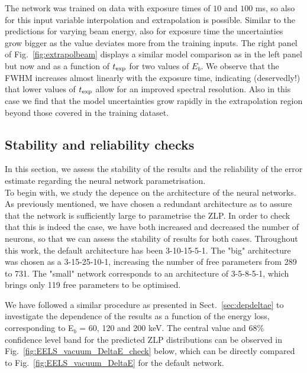 The network was trained on data with exposure times of $10$ and $100$ ms,
so also for this input variable interpolation and extrapolation is possible. 
%
Similar to the predictions for varying beam energy, also for exposure time the uncertainties 
grow bigger as the value deviates more from the training inputs.
%
The right panel of Fig.~\ref{fig:extrapolbeam} displays a similar model
comparison as in the left panel but now and as a function of $t_{\rm exp}$ for two values of $E_b$.
%
We observe that the FWHM increases almost linearly with the exposure time, indicating (deservedly!)
that lower values of $t_{\rm exp}$ allow for an improved spectral resolution.
%
Also in this case we find that the model uncertainties grow rapidly in the
extrapolation region beyond those covered in the training dataset.


\subsection{Stability and reliability checks}
In this section, we assess the stability of the results and the reliability of the 
error estimate regarding the neural network parametrisation.\\

To begin with, we study the depence on the architecture of the neural networks. 
As previously mentioned, we have chosen a redundant architecture as to assure that the network
is sufficiently large to parametrise the ZLP.
%
In order to check that this is indeed the case, we have both increased and decreased the
number of neurons, so that we can assess the stability of results for both cases.
%
Throughout this work, the default architecture has been 3-10-15-5-1. 
The "big" architecture was chosen as a 3-15-25-10-1, increasing the number of free
parameters from 289 to 731. 
%
The "small" network corresponds to an architecture of 3-5-8-5-1, which brings only 119
free parameters to be optimised. 

We have followed a similar procedure as presented in Sect.~\ref{sec:depdeltae} to investigate
the dependence of the results as a function of the energy loss, corresponding to 
E$_b$ = 60, 120 and 200 keV. 
%
The central value and 68\% confidence level band for the predicted ZLP distributions
can be observed in Fig.~\ref{fig:EELS_vacuum_DeltaE_check} below, which can be directly
compared to Fig.~\ref{fig:EELS_vacuum_DeltaE} for the default network.

